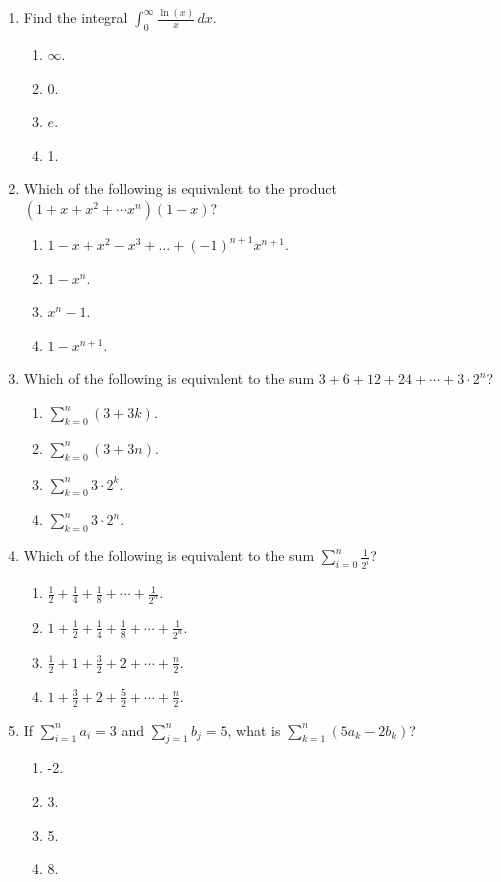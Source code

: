 \documentclass{article}
\begin{document}
\begin{enumerate}
  \item Find the integral $\displaystyle \int_{0}^\infty \frac{\ln(x)}{x} \, dx $.
  \begin{enumerate}
    \item $\infty$. %
    \item 0. 
    \item $e$. 
    \item 1. 
  \end{enumerate}
 

  \item Which of the following is equivalent to the product $(1+x+x^2+\cdots x^n)(1-x)$?
  \begin{enumerate}
    \item $1-x+x^2-x^3+\dots+(-1)^{n+1}x^{n+1}$. 
    \item $1-x^n$. 
    \item $x^n-1$.
    \item $1-x^{n+1}$. %
  \end{enumerate}
  
  \item Which of the following is equivalent to the sum $3+6+12+24+\cdots+3\cdot 2^n$?
  \begin{enumerate}
    \item $\sum_{k=0}^n (3+3k)$. 
    \item $\sum_{k=0}^n (3+3n)$. 
    \item $\sum_{k=0}^n 3\cdot2^k$. %
    \item $\sum_{k=0}^n 3\cdot2^n$.
  \end{enumerate}
  
  
  \item Which of the following is equivalent to the sum $\sum_{i=0}^n\frac{1}{2^i}$?
  \begin{enumerate}
    \item $\frac{1}{2}+\frac{1}{4}+\frac{1}{8}+\cdots+\frac{1}{2^n}$. 
    \item $1+\frac{1}{2}+\frac{1}{4}+\frac{1}{8}+\cdots+\frac{1}{2^n}$. %
    \item $\frac{1}{2}+1+\frac{3}{2}+2+\cdots+\frac{n}{2}$.
    \item $1+\frac{3}{2}+2+\frac{5}{2}+\cdots+\frac{n}{2}$.
  \end{enumerate}
  
  \item If $\sum_{i=1}^n a_i=3$ and $\sum_{j=1}^n b_j=5$, what is $\sum_{k=1}^n (5a_k-2b_k)$?
  \begin{enumerate}
    \item -2. 
    \item 3.
    \item 5. %
    \item 8.
  \end{enumerate}

  
  
  
    
\end{enumerate}
\end{document}
